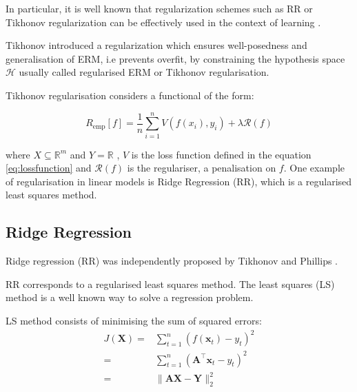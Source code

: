 In particular, it is well known that regularization schemes such as RR or
Tikhonov regularization can be effectively used in the context of learning
\cite{vito2005}.

Tikhonov introduced a regularization which ensures well-posedness and
generalisation of ERM, i.e prevents overfit, by constraining the hypothesis
space $\mathscr{H}$ usually called regularised ERM or Tikhonov regularisation.

Tikhonov regularisation considers a functional of the form:

\begin{equation} 
\label{eq:rerm}
R_{\text{emp}}[f] = \frac{1}{n} \sum_{i=1}^n V(f(x_i),y_i) + \lambda \mathcal{R}(f)
\end{equation}

\noindent where $X \subseteq \mathbb{R}^m$ and $Y = \mathbb{R}$ , $V$ is the
loss function defined in the equation \ref{eq:lossfunction} and $\mathcal{R}(f)$
is the regulariser, a penalisation on $f$. One example of regularisation in
linear models is Ridge Regression (RR), which is a regularised least squares
method.

\subsection{Ridge Regression}

Ridge regression (RR) was independently proposed by Tikhonov \cite{tikhonov1963}
and Phillips \cite{phillips1962}. 

RR corresponds to a regularised least squares
method. The least squares (LS) method is a well known way to solve a regression
problem.  

LS method consists of minimising the sum of squared errors:
\begin{eqnarray*}
\label{eq:lsm}
 J(\mathbf{X}) =& \displaystyle \sum_{t=1}^n (f(\mathbf{x}_t)-y_t)^2 \\
 =&\displaystyle \sum_{t=1}^n (\mathbf{\mathbf{A}}^\top {\mathbf{x}}_t-y_t)^2 \\
 =& \| \mathbf{A}\mathbf{\mathbf{X}} - \mathbf{Y} \|_2^2 
\end{eqnarray*}

